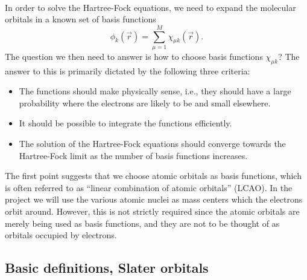 \documentclass[%
twoside,                 %
final,                   %
10pt]{article}
\begin{document}
\paragraph{}

In order to solve the Hartree-Fock equations, we need to expand the molecular orbitals in a known
set of basis functions
\begin{equation}
 \phi_k(\vec r) = \sum_{\mu=1}^M\chi_{\mu k}(\vec r).
\end{equation}
The question we then need to answer is how to choose basis functions $\chi_{\mu k}$? The answer to this
is primarily dictated by the following three criteria:

\begin{itemize}
  \item The functions should make physically sense, i.e., they should have a large probability where   the electrons are likely to be and small elsewhere.

  \item It should be possible to integrate the functions efficiently.

  \item The solution of the Hartree-Fock equations should converge towards the Hartree-Fock limit        as the number of basis functions increases.
\end{itemize}

\noindent
The first point suggests that we choose atomic orbitals as basis functions,  which is often
referred to as ``linear combination of atomic orbitals'' (LCAO). In the project we will use the various atomic nuclei as mass centers which the electrons orbit around. However, this is not strictly required since the
atomic orbitals are merely being used as basis functions, and they are not to be thought of
as orbitals occupied by electrons.



\subsection*{Basic definitions, Slater orbitals}

\paragraph{}
\end{document}
